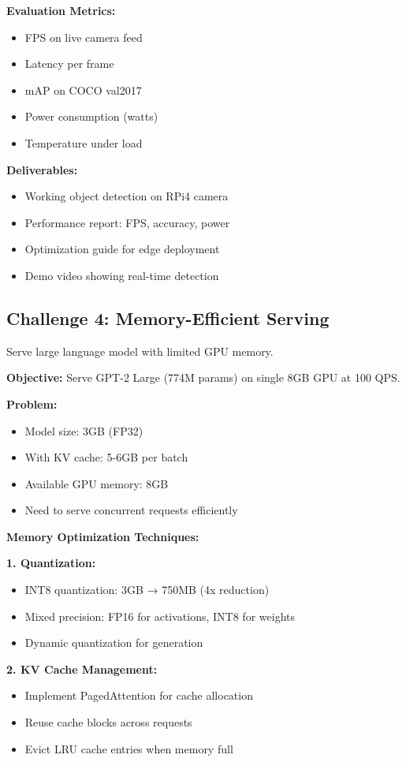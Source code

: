 \textbf{Evaluation Metrics:}
\begin{itemize}
    \item FPS on live camera feed
    \item Latency per frame
    \item mAP on COCO val2017
    \item Power consumption (watts)
    \item Temperature under load
\end{itemize}

\textbf{Deliverables:}
\begin{itemize}
    \item Working object detection on RPi4 camera
    \item Performance report: FPS, accuracy, power
    \item Optimization guide for edge deployment
    \item Demo video showing real-time detection
\end{itemize}

\subsection{Challenge 4: Memory-Efficient Serving}

Serve large language model with limited GPU memory.

\textbf{Objective:} Serve GPT-2 Large (774M params) on single 8GB GPU at 100 QPS.

\textbf{Problem:}
\begin{itemize}
    \item Model size: 3GB (FP32)
    \item With KV cache: 5-6GB per batch
    \item Available GPU memory: 8GB
    \item Need to serve concurrent requests efficiently
\end{itemize}

\textbf{Memory Optimization Techniques:}

\textbf{1. Quantization:}
\begin{itemize}
    \item INT8 quantization: 3GB → 750MB (4x reduction)
    \item Mixed precision: FP16 for activations, INT8 for weights
    \item Dynamic quantization for generation
\end{itemize}

\textbf{2. KV Cache Management:}
\begin{itemize}
    \item Implement PagedAttention for cache allocation
    \item Reuse cache blocks across requests
    \item Evict LRU cache entries when memory full
\end{itemize}

